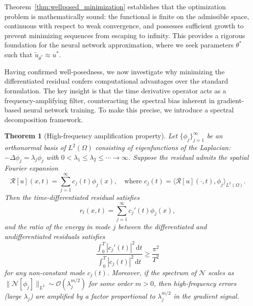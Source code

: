\documentclass[11pt,reqno]{amsart}
\theoremstyle{plain}
\newtheorem{theorem}{Theorem}[section]
\theoremstyle{definition}
\theoremstyle{remark}
\begin{document}
Theorem~\ref{thm:wellposed_minimization} establishes that the optimization problem is mathematically sound: the functional is finite on the admissible space, continuous with respect to weak convergence, and possesses sufficient growth to prevent minimizing sequences from escaping to infinity. This provides a rigorous foundation for the neural network approximation, where we seek parameters $\theta^*$ such that $\tilde{u}_{\theta^*} \approx u^*$.

Having confirmed well-posedness, we now investigate why minimizing the differentiated residual confers computational advantages over the standard formulation. The key insight is that the time derivative operator acts as a frequency-amplifying filter, counteracting the spectral bias inherent in gradient-based neural network training. To make this precise, we introduce a spectral decomposition framework.

\begin{theorem}[High-frequency amplification property]\label{thm:highfreq_amplification}
Let $\{\phi_j\}_{j=1}^\infty$ be an orthonormal basis of $L^2(\Omega)$ consisting of eigenfunctions of the Laplacian: $-\Delta \phi_j = \lambda_j \phi_j$ with $0 < \lambda_1 \leq \lambda_2 \leq \cdots \to \infty$. Suppose the residual admits the spatial Fourier expansion
\begin{equation}
    \mathcal{R}[u](x,t) = \sum_{j=1}^\infty c_j(t) \phi_j(x), \quad \text{where } c_j(t) = \langle \mathcal{R}[u](\cdot,t), \phi_j \rangle_{L^2(\Omega)}.
\end{equation}
Then the time-differentiated residual satisfies
\begin{equation}
    r_t(x,t) = \sum_{j=1}^\infty c_j'(t) \phi_j(x),
\end{equation}
and the ratio of the energy in mode $j$ between the differentiated and undifferentiated residuals satisfies
\begin{equation}\label{eq:amplification_ratio}
    \frac{\int_0^T |c_j'(t)|^2 \, \mathrm{d}t}{\int_0^T |c_j(t)|^2 \, \mathrm{d}t} \geq \frac{\pi^2}{T^2}
\end{equation}
for any non-constant mode $c_j(t)$. Moreover, if the spectrum of $\mathcal{N}$ scales as $\|\mathcal{N}[\phi_j]\|_{L^2} \sim \mathcal{O}(\lambda_j^{m/2})$ for some order $m > 0$, then high-frequency errors (large $\lambda_j$) are amplified by a factor proportional to $\lambda_j^{m/2}$ in the gradient signal.
\end{theorem}
\end{document}
